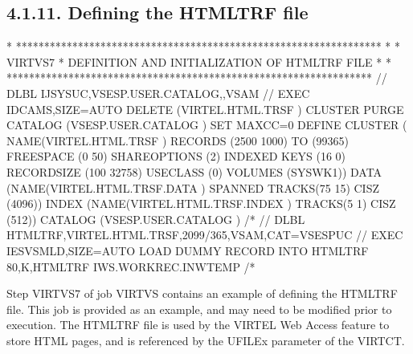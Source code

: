 \documentclass[letterpaper,10pt,english]{sphinxmanual}
\begin{document}
\subsection{4.1.11. Defining the HTMLTRF file}
\label{\detokenize{Installation_Guide:defining-the-htmltrf-file}}
\begin{sphinxVerbatim}[commandchars=\\\{\}]
* *****************************************************************
* * VIRTVS7 * DEFINITION AND INITIALIZATION OF HTMLTRF FILE *
* *****************************************************************
// DLBL IJSYSUC,\PYGZsq{}VSESP.USER.CATALOG\PYGZsq{},,VSAM
// EXEC IDCAMS,SIZE=AUTO
  DELETE (VIRTEL.HTML.TRSF ) \PYGZhy{}
    CLUSTER \PYGZhy{}
    PURGE \PYGZhy{}
    CATALOG (VSESP.USER.CATALOG )
  SET MAXCC=0
  DEFINE CLUSTER ( \PYGZhy{}
    NAME(VIRTEL.HTML.TRSF ) \PYGZhy{}
    RECORDS (2500 1000) \PYGZhy{}
    TO (99365) \PYGZhy{}
    FREESPACE (0 50) \PYGZhy{}
    SHAREOPTIONS (2) \PYGZhy{}
    INDEXED \PYGZhy{}
    KEYS (16 0) \PYGZhy{}
    RECORDSIZE (100 32758) \PYGZhy{}
    USECLASS (0) \PYGZhy{}
    VOLUMES (SYSWK1)) \PYGZhy{}
  DATA (NAME(VIRTEL.HTML.TRSF.DATA ) \PYGZhy{}
    SPANNED \PYGZhy{}
    TRACKS(75 15) \textendash{}
    CISZ (4096)) \PYGZhy{}
  INDEX (NAME(VIRTEL.HTML.TRSF.INDEX ) \PYGZhy{}
    TRACKS(5 1) \textendash{}
    CISZ (512)) \PYGZhy{}
    CATALOG (VSESP.USER.CATALOG )
/*
// DLBL HTMLTRF,\PYGZsq{}VIRTEL.HTML.TRSF\PYGZsq{},2099/365,VSAM,CAT=VSESPUC
// EXEC IESVSMLD,SIZE=AUTO LOAD DUMMY RECORD INTO HTMLTRF
80,K,HTMLTRF
\PYGZdl{}\PYGZdl{}\PYGZdl{}\PYGZdl{}IWS.WORKREC.INW\PYGZdl{}TEMP
/*
\end{sphinxVerbatim}


Step VIRTVS7 of job VIRTVS contains an example of defining the HTMLTRF file. This job is provided as an example, and may need to be modified prior to execution. The HTMLTRF file is used by the VIRTEL Web Access feature to store HTML pages, and is referenced by the UFILEx parameter of the VIRTCT.
\end{document}
